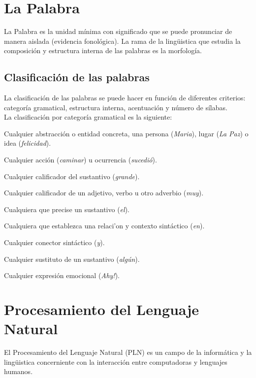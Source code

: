 \section{La Palabra}
La Palabra es la unidad m\'inima con significado que se puede pronunciar de manera
aislada (evidencia fonol\'ogica)\cite{HOET09}. La rama de la ling\"uistica que estudia
la composici\'on y estructura interna de las palabras es la morfolog\'ia.

\subsection{Clasificaci\'on de las palabras}
La clasificaci\'on de las palabras se puede hacer en funci\'on de diferentes criterios:
categor\'ia gramatical, estructura interna, acentuaci\'on y n\'umero de s\'ilabas. \\

La clasificaci\'on por categor\'ia gramatical es la siguiente:

\begin{description}[leftmargin=0cm]
	\item[Sustantivo] Cualquier abstracci\'on o entidad concreta, una 
	persona (\emph{Maria}), lugar (\emph{La Paz}) o idea (\emph{felicidad}).
	\item[Verbo] Cualquier acci\'on (\emph{caminar}) u ocurrencia (\emph{sucedi\'o}).
	\item[Adjetivo] Cualquier calificador del sustantivo (\emph{grande}).
	\item[Adverbio] Cualquier calificador de un adjetivo, verbo u otro
	adverbio (\emph{muy}).
	\item[Determinante] Cualquiera que precise un sustantivo (\emph{el}).
	\item[Preposici\'on] Cualquiera que establezca una relaci'on y contexto sint\'actico
	(\emph{en}).
	\item[Conjunci\'on] Cualquier conector sint\'actico (\emph{y}).
	\item[Pronombre] Cualquier sustituto de un sustantivo (\emph{alg\'un}).
	\item[Interjecci\'on] Cualquier expresi\'on emocional (\emph{Ahy!}).
\end{description}


\section{Procesamiento del Lenguaje Natural}
El Procesamiento del Lenguaje Natural (PLN) es un campo de la inform\'atica y la 
ling\"uistica concerniente con la interacci\'on entre computadoras y lenguajes
humanos. \\

